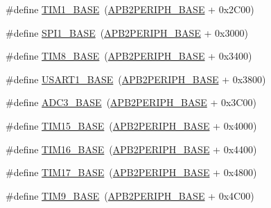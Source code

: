 \begin{DoxyCompactItemize}
\item 
\#define \hyperlink{group___peripheral__memory__map_gaf8aa324ca5011b8173ab16585ed7324a}{T\+I\+M1\+\_\+\+B\+A\+SE}~(\hyperlink{group___peripheral__memory__map_ga25b99d6065f1c8f751e78f43ade652cb}{A\+P\+B2\+P\+E\+R\+I\+P\+H\+\_\+\+B\+A\+SE} + 0x2\+C00)
\item 
\#define \hyperlink{group___peripheral__memory__map_ga50cd8b47929f18b05efbd0f41253bf8d}{S\+P\+I1\+\_\+\+B\+A\+SE}~(\hyperlink{group___peripheral__memory__map_ga25b99d6065f1c8f751e78f43ade652cb}{A\+P\+B2\+P\+E\+R\+I\+P\+H\+\_\+\+B\+A\+SE} + 0x3000)
\item 
\#define \hyperlink{group___peripheral__memory__map_ga5b72f698b7a048a6f9fcfe2efe5bc1db}{T\+I\+M8\+\_\+\+B\+A\+SE}~(\hyperlink{group___peripheral__memory__map_ga25b99d6065f1c8f751e78f43ade652cb}{A\+P\+B2\+P\+E\+R\+I\+P\+H\+\_\+\+B\+A\+SE} + 0x3400)
\item 
\#define \hyperlink{group___peripheral__memory__map_ga86162ab3f740db9026c1320d46938b4d}{U\+S\+A\+R\+T1\+\_\+\+B\+A\+SE}~(\hyperlink{group___peripheral__memory__map_ga25b99d6065f1c8f751e78f43ade652cb}{A\+P\+B2\+P\+E\+R\+I\+P\+H\+\_\+\+B\+A\+SE} + 0x3800)
\item 
\#define \hyperlink{group___peripheral__memory__map_gaca766f86c8e0b00a8e2b0224dcbb4c82}{A\+D\+C3\+\_\+\+B\+A\+SE}~(\hyperlink{group___peripheral__memory__map_ga25b99d6065f1c8f751e78f43ade652cb}{A\+P\+B2\+P\+E\+R\+I\+P\+H\+\_\+\+B\+A\+SE} + 0x3\+C00)
\item 
\#define \hyperlink{group___peripheral__memory__map_ga7ab42ce1846930569d742d339b554078}{T\+I\+M15\+\_\+\+B\+A\+SE}~(\hyperlink{group___peripheral__memory__map_ga25b99d6065f1c8f751e78f43ade652cb}{A\+P\+B2\+P\+E\+R\+I\+P\+H\+\_\+\+B\+A\+SE} + 0x4000)
\item 
\#define \hyperlink{group___peripheral__memory__map_ga16c97093a531d763b0794c3e6d09e1bf}{T\+I\+M16\+\_\+\+B\+A\+SE}~(\hyperlink{group___peripheral__memory__map_ga25b99d6065f1c8f751e78f43ade652cb}{A\+P\+B2\+P\+E\+R\+I\+P\+H\+\_\+\+B\+A\+SE} + 0x4400)
\item 
\#define \hyperlink{group___peripheral__memory__map_gaffbedbe30e8c4cffdea326d6c1800574}{T\+I\+M17\+\_\+\+B\+A\+SE}~(\hyperlink{group___peripheral__memory__map_ga25b99d6065f1c8f751e78f43ade652cb}{A\+P\+B2\+P\+E\+R\+I\+P\+H\+\_\+\+B\+A\+SE} + 0x4800)
\item 
\#define \hyperlink{group___peripheral__memory__map_ga92ae902be7902560939223dd765ece08}{T\+I\+M9\+\_\+\+B\+A\+SE}~(\hyperlink{group___peripheral__memory__map_ga25b99d6065f1c8f751e78f43ade652cb}{A\+P\+B2\+P\+E\+R\+I\+P\+H\+\_\+\+B\+A\+SE} + 0x4\+C00)

\end{DoxyCompactItemize}
